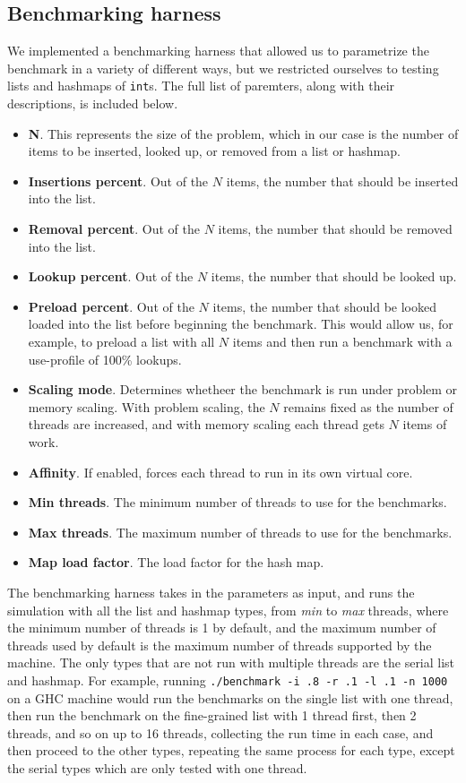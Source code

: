 \documentclass[11pt]{article}
\begin{document}
\subsection{Benchmarking harness}
We implemented a benchmarking harness that allowed us to parametrize the
benchmark in a variety of different ways, but we restricted ourselves to testing
lists and hashmaps of {\tt int}s. The full list of paremters, along with their
descriptions, is included below.

\begin{itemize}
\item
{\bf N}. This represents the size of the problem, which in our case is the
number of items to be inserted, looked up, or removed from a list or hashmap.
\item
{\bf Insertions percent}. Out of the $N$ items, the number that should be
inserted into the list.
\item
{\bf Removal percent}. Out of the $N$ items, the number that should be removed
into the list.
\item
{\bf Lookup percent}. Out of the $N$ items, the number that should be looked up.
\item
{\bf Preload percent}. Out of the $N$ items, the number that should be looked
loaded into the list before beginning the benchmark. This would allow us, for
example, to preload a list with all $N$ items and then run a benchmark with a
use-profile of 100\% lookups.
\item
{\bf Scaling mode}. Determines whetheer the benchmark is run under problem or
memory scaling. With problem scaling, the $N$ remains fixed as the number of
threads are increased, and with memory scaling each thread gets $N$ items of
work.
\item
{\bf Affinity}. If enabled, forces each thread to run in its own virtual core.
\item
{\bf Min threads}. The minimum number of threads to use for the benchmarks.
\item
{\bf Max threads}. The maximum number of threads to use for the benchmarks.
\item
{\bf Map load factor}. The load factor for the hash map.
\end{itemize}

The benchmarking harness takes in the parameters as input, and runs the
simulation with all the list and hashmap types, from {\it min} to {\it max}
threads, where the minimum number of threads is 1 by default, and the maximum
number of threads used by default is the maximum number of threads supported by
the machine. The only types that are not run with multiple threads are the
serial list and hashmap. For example, running
{\tt ./benchmark -i .8 -r .1 -l .1 -n 1000} on a GHC machine would run the
benchmarks on the single list with one thread, then run the benchmark on the
fine-grained list with 1 thread first, then 2 threads, and so on up to 16
threads, collecting the run time in each case, and then proceed to the other
types, repeating the same process for each type, except the serial types which
are only tested with one thread.
\end{document}
